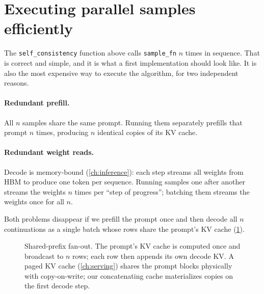 \section{Executing parallel samples efficiently}\label{sec:scaling:prefix}

The \texttt{self\_consistency} function above calls \texttt{sample\_fn} $n$ times in sequence. That
is correct and simple, and it is what a first implementation should look like. It is also the most
expensive way to execute the algorithm, for two independent reasons.

\paragraph{Redundant prefill.} All $n$ samples share the same prompt. Running them separately
prefills that prompt $n$ times, producing $n$ identical copies of its KV cache.

\paragraph{Redundant weight reads.} Decode is memory-bound (\cref{ch:inference}): each step streams
all weights from HBM to produce one token per sequence. Running samples one after another streams
the weights $n$ times per ``step of progress''; batching them streams the weights once for all $n$.

Both problems disappear if we prefill the prompt once and then decode all $n$ continuations as a
single batch whose rows share the prompt's KV cache (\cref{fig:scaling:fanout}).

\begin{figure}[t]
\centering
{}
\caption{Shared-prefix fan-out. The prompt's KV cache is computed once and broadcast to $n$ rows;
each row then appends its own decode KV. A paged KV cache (\cref{ch:serving}) shares the prompt
blocks physically with copy-on-write; our concatenating cache materializes copies on the first
decode step.}
\label{fig:scaling:fanout}
\end{figure}

